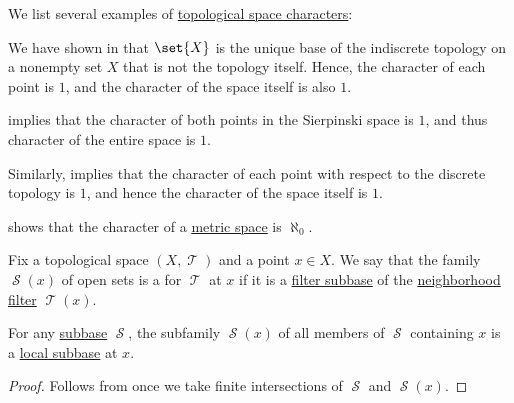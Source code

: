 \begin{example}\label{ex:def:topological_space_character}
  We list several examples of \hyperref[def:topological_space_character]{topological space characters}:
  \begin{thmenum}
     We have shown in  that \( \set{ X } \) is the unique base of the indiscrete topology on a nonempty set \( X \) that is not the topology itself. Hence, the character of each point is \( 1 \), and the character of the space itself is also \( 1 \).

      implies that the character of both points in the Sierpinski space is \( 1 \), and thus character of the entire space is \( 1 \).

     Similarly,  implies that the character of each point with respect to the discrete topology is \( 1 \), and hence the character of the space itself is \( 1 \).

      shows that the character of a \hyperref[def:metric_space]{metric space} is \( \aleph_0 \).
  \end{thmenum}
\end{example}

\begin{definition}\label{def:topological_local_subbase}\mimprovised
  Fix a topological space \( (X, \mscrT) \) and a point \( x \in X \). We say that the family \( \mscrS(x) \) of open sets is a  for \( \mscrT \) at \( x \) if it is a \hyperref[def:filter_subbase]{filter subbase} of the \hyperref[def:neighborhood_system]{neighborhood filter} \( \mscrT(x) \).
\end{definition}

\begin{proposition}\label{thm:global_base_to_local_subbase}
  For any \hyperref[def:topological_subbase]{subbase} \( \mscrS \), the subfamily \( \mscrS(x) \) of all members of \( \mscrS \) containing \( x \) is a \hyperref[def:topological_local_subbase]{local subbase} at \( x \).
\end{proposition}
\begin{proof}
  Follows from  once we take finite intersections of \( \mscrS \) and \( \mscrS(x) \).
\end{proof}

